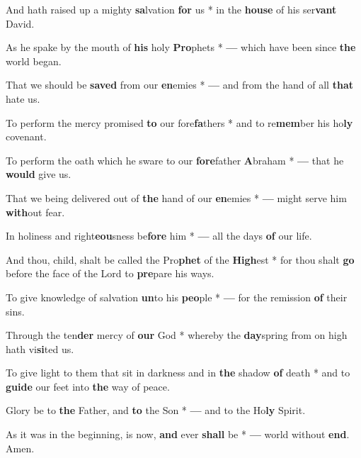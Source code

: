 \begin{multicols}{2}
	And hath raised up a mighty \textbf{sa}lvation \textbf{for} us * in the \textbf{house} of his ser\textbf{vant} David.
	
	As he spake by the mouth of \textbf{his} holy \textbf{Pro}phets * \textbf{---} which have been since \textbf{the} world began.
	
	That we should be \textbf{saved} from our \textbf{en}emies * \textbf{---} and from the hand of all \textbf{that} hate us.
	
	To perform the mercy promised \textbf{to} our fore\textbf{fa}thers * and to re\textbf{mem}ber his ho\textbf{ly} covenant.
	
	To perform the oath which he sware to our \textbf{fore}father \textbf{A}braham * \textbf{---} that he \textbf{would} give us.
	
	That we being delivered out of \textbf{the} hand of our \textbf{en}emies * \textbf{---} might serve him \textbf{with}out fear.
	
	In holiness and right\textbf{eou}sness be\textbf{fore} him * \textbf{---} all the days \textbf{of} our life.
	
	And thou, child, shalt be called the Pro\textbf{phet} of the \textbf{High}est * for thou shalt \textbf{go} before the face of the Lord to \textbf{pre}pare his ways.
	
	To give knowledge of salvation \textbf{un}to his \textbf{peo}ple * \textbf{---} for the remission \textbf{of} their sins.
	
	Through the ten\textbf{der} mercy of \textbf{our} God * whereby the \textbf{day}spring from on high hath vi\textbf{si}ted us.
	
	To give light to them that sit in darkness and in \textbf{the} shadow \textbf{of} death * and to \textbf{guide} our feet into \textbf{the} way of peace.
	
	Glory be to \textbf{the} Father, and \textbf{to} the Son * \textbf{---} and to the Ho\textbf{ly} Spirit.
	
	As it was in the beginning, is now, \textbf{and} ever \textbf{shall} be * \textbf{---} world without \textbf{end}. Amen.
\end{multicols}